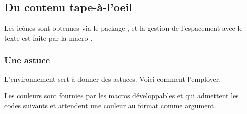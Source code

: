 \documentclass[12pt, a4paper]{article}
\begin{document}
\subsection{Du contenu tape-à-l'oeil}

\begin{tdocnote}
    Les icônes sont obtenues via le package , et la gestion de l'espacement avec le texte est faite par la macro .
\end{tdocnote}


\subsubsection{Une astuce}

L'environnement  sert à donner des astuces. Voici comment l'employer.



\smallskip

\begin{tdocnote}
    Les couleurs sont fournies par les macros développables  et  qui admettent les codes suivants et attendent une couleur au format  comme argument.

    \begin{tdoclatex}[code]
    \end{tdoclatex}
\end{tdocnote}
\end{document}
